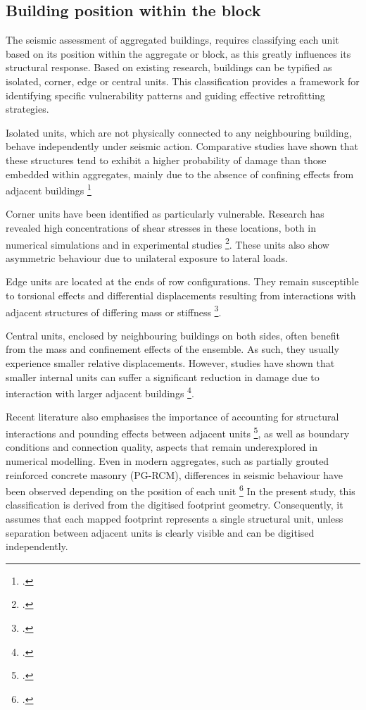 \begin{refsection}
\subsection{Building position within the block}

The seismic assessment of aggregated buildings, requires classifying each unit based on its position within the aggregate or block, as this greatly influences its structural response. Based on existing research, buildings can be typified as isolated, corner, edge or central units. This classification provides a framework for identifying specific vulnerability patterns and guiding effective retrofitting strategies.

Isolated units, which are not physically connected to any neighbouring building, behave independently under seismic action. Comparative studies have shown that these structures tend to exhibit a higher probability of damage than those embedded within aggregates, mainly due to the absence of confining effects from adjacent buildings \footcite{chieffo_comparative_2019}

Corner units have been identified as particularly vulnerable. Research has revealed high concentrations of shear stresses in these locations, both in numerical simulations and in experimental studies \footcite{Battaglia2021, formisano_quick_2010}. These units also show asymmetric behaviour due to unilateral exposure to lateral loads.

Edge units are located at the ends of row configurations. They remain susceptible to torsional effects and differential displacements resulting from interactions with adjacent structures of differing mass or stiffness \footcite{Battaglia2021, valente_historical_2019}.

Central units, enclosed by neighbouring buildings on both sides, often benefit from the mass and confinement effects of the ensemble. As such, they usually experience smaller relative displacements. However, studies have shown that smaller internal units can suffer a significant reduction in damage due to interaction with larger adjacent buildings \footcite{greco_seismic_2020}.

Recent literature also emphasises the importance of accounting for structural interactions and pounding effects between adjacent units \footcite{angiolilli_seismic_2021}, as well as boundary conditions and connection quality, aspects that remain underexplored in numerical modelling. Even in modern aggregates, such as partially grouted reinforced concrete masonry (PG-RCM), differences in seismic behaviour have been observed depending on the position of each unit \footcite{torres-olivares_seismic_2024, torres-olivares_numerical_2025}
In the present study, this classification is derived from the digitised footprint geometry. Consequently, it assumes that each mapped footprint represents a single structural unit, unless separation between adjacent units is clearly visible and can be digitised independently.




\end{refsection}
